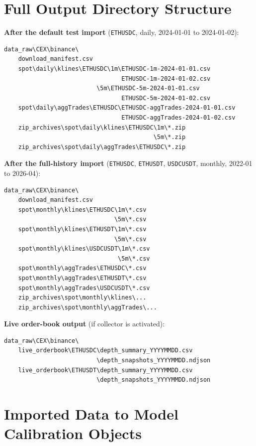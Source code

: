 \documentclass[11pt,a4paper]{article}
\begin{document}
\section{Full Output Directory Structure}
\label{sec:structure}

\textbf{After the default test import}
(\texttt{ETHUSDC}, daily, 2024-01-01 to 2024-01-02):

\begin{lstlisting}
data_raw\CEX\binance\
    download_manifest.csv
    spot\daily\klines\ETHUSDC\1m\ETHUSDC-1m-2024-01-01.csv
                                 ETHUSDC-1m-2024-01-02.csv
                          \5m\ETHUSDC-5m-2024-01-01.csv
                                 ETHUSDC-5m-2024-01-02.csv
    spot\daily\aggTrades\ETHUSDC\ETHUSDC-aggTrades-2024-01-01.csv
                                 ETHUSDC-aggTrades-2024-01-02.csv
    zip_archives\spot\daily\klines\ETHUSDC\1m\*.zip
                                          \5m\*.zip
    zip_archives\spot\daily\aggTrades\ETHUSDC\*.zip
\end{lstlisting}

\textbf{After the full-history import}
(\texttt{ETHUSDC}, \texttt{ETHUSDT}, \texttt{USDCUSDT},
monthly, 2022-01 to 2026-04):

\begin{lstlisting}
data_raw\CEX\binance\
    download_manifest.csv
    spot\monthly\klines\ETHUSDC\1m\*.csv
                               \5m\*.csv
    spot\monthly\klines\ETHUSDT\1m\*.csv
                               \5m\*.csv
    spot\monthly\klines\USDCUSDT\1m\*.csv
                                \5m\*.csv
    spot\monthly\aggTrades\ETHUSDC\*.csv
    spot\monthly\aggTrades\ETHUSDT\*.csv
    spot\monthly\aggTrades\USDCUSDT\*.csv
    zip_archives\spot\monthly\klines\...
    zip_archives\spot\monthly\aggTrades\...
\end{lstlisting}

\textbf{Live order-book output} (if collector is activated):

\begin{lstlisting}
data_raw\CEX\binance\
    live_orderbook\ETHUSDC\depth_summary_YYYYMMDD.csv
                          \depth_snapshots_YYYYMMDD.ndjson
    live_orderbook\ETHUSDT\depth_summary_YYYYMMDD.csv
                          \depth_snapshots_YYYYMMDD.ndjson
\end{lstlisting}

\section{Imported Data to Model Calibration Objects}
\label{sec:use}
\end{document}
